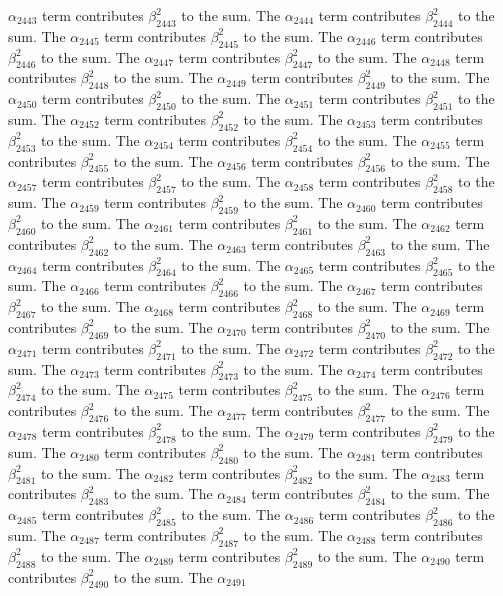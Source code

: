 \begin{lemma}
$\alpha_{2443}$ term contributes $\beta_{2443}^{2}$ to the sum. The $\alpha_{2444}$ term contributes $\beta_{2444}^{2}$ to the sum. The $\alpha_{2445}$ term contributes $\beta_{2445}^{2}$ to the sum. The $\alpha_{2446}$ term contributes $\beta_{2446}^{2}$ to the sum. The $\alpha_{2447}$ term contributes $\beta_{2447}^{2}$ to the sum. The $\alpha_{2448}$ term contributes $\beta_{2448}^{2}$ to the sum. The $\alpha_{2449}$ term contributes $\beta_{2449}^{2}$ to the sum. The $\alpha_{2450}$ term contributes $\beta_{2450}^{2}$ to the sum. The $\alpha_{2451}$ term contributes $\beta_{2451}^{2}$ to the sum. The $\alpha_{2452}$ term contributes $\beta_{2452}^{2}$ to the sum. The $\alpha_{2453}$ term contributes $\beta_{2453}^{2}$ to the sum. The $\alpha_{2454}$ term contributes $\beta_{2454}^{2}$ to the sum. The $\alpha_{2455}$ term contributes $\beta_{2455}^{2}$ to the sum. The $\alpha_{2456}$ term contributes $\beta_{2456}^{2}$ to the sum. The $\alpha_{2457}$ term contributes $\beta_{2457}^{2}$ to the sum. The $\alpha_{2458}$ term contributes $\beta_{2458}^{2}$ to the sum. The $\alpha_{2459}$ term contributes $\beta_{2459}^{2}$ to the sum. The $\alpha_{2460}$ term contributes $\beta_{2460}^{2}$ to the sum. The $\alpha_{2461}$ term contributes $\beta_{2461}^{2}$ to the sum. The $\alpha_{2462}$ term contributes $\beta_{2462}^{2}$ to the sum. The $\alpha_{2463}$ term contributes $\beta_{2463}^{2}$ to the sum. The $\alpha_{2464}$ term contributes $\beta_{2464}^{2}$ to the sum. The $\alpha_{2465}$ term contributes $\beta_{2465}^{2}$ to the sum. The $\alpha_{2466}$ term contributes $\beta_{2466}^{2}$ to the sum. The $\alpha_{2467}$ term contributes $\beta_{2467}^{2}$ to the sum. The $\alpha_{2468}$ term contributes $\beta_{2468}^{2}$ to the sum. The $\alpha_{2469}$ term contributes $\beta_{2469}^{2}$ to the sum. The $\alpha_{2470}$ term contributes $\beta_{2470}^{2}$ to the sum. The $\alpha_{2471}$ term contributes $\beta_{2471}^{2}$ to the sum. The $\alpha_{2472}$ term contributes $\beta_{2472}^{2}$ to the sum. The $\alpha_{2473}$ term contributes $\beta_{2473}^{2}$ to the sum. The $\alpha_{2474}$ term contributes $\beta_{2474}^{2}$ to the sum. The $\alpha_{2475}$ term contributes $\beta_{2475}^{2}$ to the sum. The $\alpha_{2476}$ term contributes $\beta_{2476}^{2}$ to the sum. The $\alpha_{2477}$ term contributes $\beta_{2477}^{2}$ to the sum. The $\alpha_{2478}$ term contributes $\beta_{2478}^{2}$ to the sum. The $\alpha_{2479}$ term contributes $\beta_{2479}^{2}$ to the sum. The $\alpha_{2480}$ term contributes $\beta_{2480}^{2}$ to the sum. The $\alpha_{2481}$ term contributes $\beta_{2481}^{2}$ to the sum. The $\alpha_{2482}$ term contributes $\beta_{2482}^{2}$ to the sum. The $\alpha_{2483}$ term contributes $\beta_{2483}^{2}$ to the sum. The $\alpha_{2484}$ term contributes $\beta_{2484}^{2}$ to the sum. The $\alpha_{2485}$ term contributes $\beta_{2485}^{2}$ to the sum. The $\alpha_{2486}$ term contributes $\beta_{2486}^{2}$ to the sum. The $\alpha_{2487}$ term contributes $\beta_{2487}^{2}$ to the sum. The $\alpha_{2488}$ term contributes $\beta_{2488}^{2}$ to the sum. The $\alpha_{2489}$ term contributes $\beta_{2489}^{2}$ to the sum. The $\alpha_{2490}$ term contributes $\beta_{2490}^{2}$ to the sum. The $\alpha_{2491}$ 
\end{lemma}
